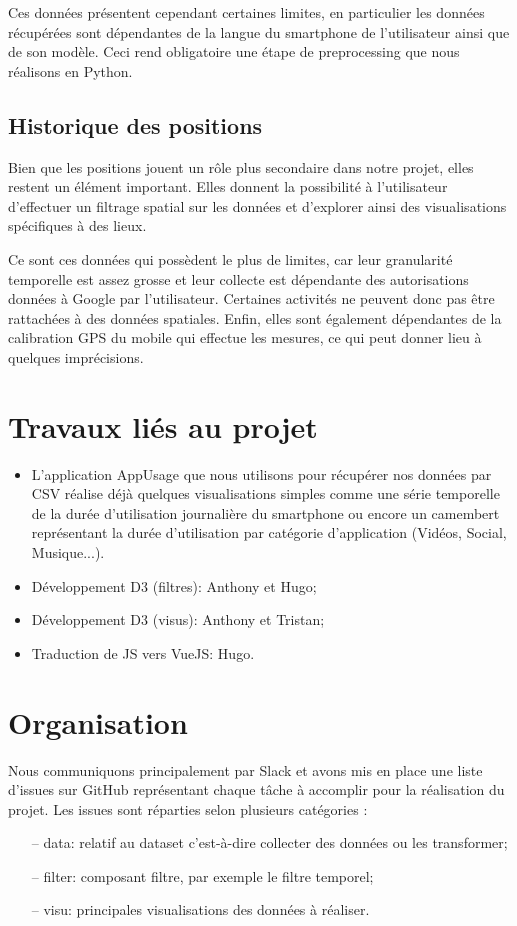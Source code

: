 \documentclass[a4paper, 11pt]{article}
\begin{document}
        Ces données présentent cependant certaines limites, en particulier les données récupérées sont dépendantes de la langue du smartphone de l'utilisateur ainsi que de son modèle. Ceci rend obligatoire une étape de preprocessing que nous réalisons en Python.

        \subsection{Historique des positions}
        Bien que les positions jouent un rôle plus secondaire dans notre projet, elles restent un élément important. Elles donnent la possibilité à l'utilisateur d'effectuer un filtrage spatial sur les données et d'explorer ainsi des visualisations spécifiques à des lieux.

        Ce sont ces données qui possèdent le plus de limites, car leur granularité temporelle est assez grosse et leur collecte est dépendante des autorisations données à Google par l'utilisateur. Certaines activités ne peuvent donc pas être rattachées à des données spatiales. Enfin, elles sont également dépendantes de la calibration GPS du mobile qui effectue les mesures, ce qui peut donner lieu à quelques imprécisions.

    \section{Travaux liés au projet}
    \begin{itemize}
    \item L'application AppUsage que nous utilisons pour récupérer nos données par CSV réalise déjà quelques visualisations simples comme une série temporelle de la durée d'utilisation journalière du smartphone ou encore un camembert représentant la durée d'utilisation par catégorie d'application (Vidéos, Social, Musique...).
    \item Développement D3 (filtres): Anthony et Hugo;
    \item Développement D3 (visus): Anthony et Tristan;
    \item Traduction de JS vers VueJS: Hugo.
    \end{itemize}

    \section{Organisation}
    Nous communiquons principalement par Slack et avons mis en place une liste d'issues sur GitHub représentant chaque tâche à accomplir pour la réalisation du projet. Les issues sont réparties selon plusieurs catégories :
    \begin{itemize}
    \item[--] data: relatif au dataset c'est-à-dire collecter des données ou les transformer;
    \item[--] filter: composant filtre, par exemple le filtre temporel;
    \item[--] visu: principales visualisations des données à réaliser.
    \end{itemize}
    
\end{document}
